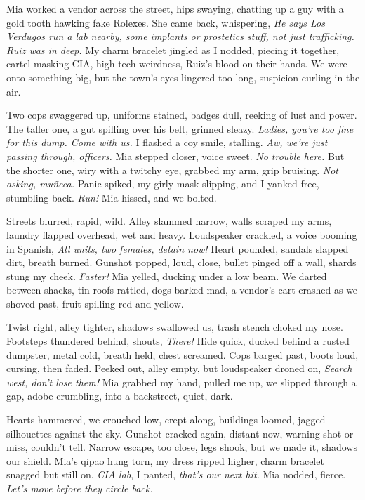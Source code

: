 \documentclass[12pt,oneside]{book} %
\begin{document}
Mia worked a vendor across the street, hips swaying, chatting up a guy with a gold tooth hawking fake Rolexes. She came back, whispering, \textit{He says Los Verdugos run a lab nearby, some implants or prostetics stuff, not just trafficking. Ruiz was in deep.} My charm bracelet jingled as I nodded, piecing it together, cartel masking CIA, high-tech weirdness, Ruiz’s blood on their hands. We were onto something big, but the town’s eyes lingered too long, suspicion curling in the air.

Two cops swaggered up, uniforms stained, badges dull, reeking of lust and power. The taller one, a gut spilling over his belt, grinned sleazy. \textit{Ladies, you’re too fine for this dump. Come with us.} I flashed a coy smile, stalling. \textit{Aw, we’re just passing through, officers.} Mia stepped closer, voice sweet. \textit{No trouble here.} But the shorter one, wiry with a twitchy eye, grabbed my arm, grip bruising. \textit{Not asking, muñeca.} Panic spiked, my girly mask slipping, and I yanked free, stumbling back. \textit{Run!} Mia hissed, and we bolted.

Streets blurred, rapid, wild. Alley slammed narrow, walls scraped my arms, laundry flapped overhead, wet and heavy. Loudspeaker crackled, a voice booming in Spanish, \textit{All units, two females, detain now!} Heart pounded, sandals slapped dirt, breath burned. Gunshot popped, loud, close, bullet pinged off a wall, shards stung my cheek. \textit{Faster!} Mia yelled, ducking under a low beam. We darted between shacks, tin roofs rattled, dogs barked mad, a vendor’s cart crashed as we shoved past, fruit spilling red and yellow.

Twist right, alley tighter, shadows swallowed us, trash stench choked my nose. Footsteps thundered behind, shouts, \textit{There!} Hide quick, ducked behind a rusted dumpster, metal cold, breath held, chest screamed. Cops barged past, boots loud, cursing, then faded. Peeked out, alley empty, but loudspeaker droned on, \textit{Search west, don’t lose them!} Mia grabbed my hand, pulled me up, we slipped through a gap, adobe crumbling, into a backstreet, quiet, dark.

Hearts hammered, we crouched low, crept along, buildings loomed, jagged silhouettes against the sky. Gunshot cracked again, distant now, warning shot or miss, couldn’t tell. Narrow escape, too close, legs shook, but we made it, shadows our shield. Mia’s qipao hung torn, my dress ripped higher, charm bracelet snagged but still on. \textit{CIA lab}, I panted, \textit{that’s our next hit.} Mia nodded, fierce. \textit{Let’s move before they circle back.}
\end{document}
